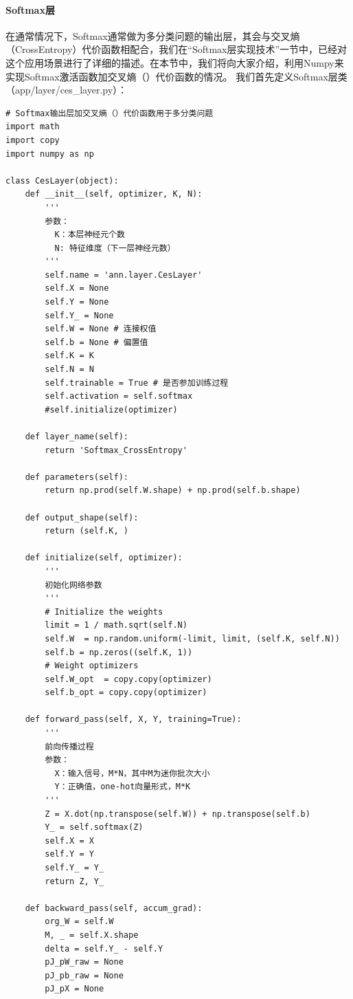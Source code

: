 \documentclass[UTF8]{article}
\begin{document}
\paragraph{Softmax层}
在通常情况下，Softmax通常做为多分类问题的输出层，其会与交叉熵（CrossEntropy）代价函数相配合，我们在“Softmax层实现技术”一节中，已经对这个应用场景进行了详细的描述。在本节中，我们将向大家介绍，利用Numpy来实现Softmax激活函数加交叉熵（）代价函数的情况。\newline
我们首先定义Softmax层类（app/layer/ces\_layer.py）：
\begin{lstlisting}
# Softmax输出层加交叉熵（）代价函数用于多分类问题
import math
import copy
import numpy as np

class CesLayer(object):
    def __init__(self, optimizer, K, N):
        '''
        参数：
          K：本层神经元个数
          N: 特征维度（下一层神经元数）
        '''
        self.name = 'ann.layer.CesLayer'
        self.X = None
        self.Y = None
        self.Y_ = None
        self.W = None # 连接权值
        self.b = None # 偏置值
        self.K = K
        self.N = N
        self.trainable = True # 是否参加训练过程
        self.activation = self.softmax
        #self.initialize(optimizer)

    def layer_name(self):
        return 'Softmax_CrossEntropy'

    def parameters(self):
        return np.prod(self.W.shape) + np.prod(self.b.shape)

    def output_shape(self):
        return (self.K, )

    def initialize(self, optimizer):
        '''
        初始化网络参数
        '''
        # Initialize the weights
        limit = 1 / math.sqrt(self.N)
        self.W  = np.random.uniform(-limit, limit, (self.K, self.N))
        self.b = np.zeros((self.K, 1))
        # Weight optimizers
        self.W_opt  = copy.copy(optimizer)
        self.b_opt = copy.copy(optimizer)

    def forward_pass(self, X, Y, training=True):
        '''
        前向传播过程
        参数：
          X：输入信号，M*N，其中M为迷你批次大小
          Y：正确值，one-hot向量形式，M*K
        '''
        Z = X.dot(np.transpose(self.W)) + np.transpose(self.b)
        Y_ = self.softmax(Z)
        self.X = X
        self.Y = Y
        self.Y_ = Y_
        return Z, Y_

    def backward_pass(self, accum_grad):
        org_W = self.W
        M, _ = self.X.shape
        delta = self.Y_ - self.Y
        pJ_pW_raw = None
        pJ_pb_raw = None
        pJ_pX = None


\end{lstlisting}
\end{document}
